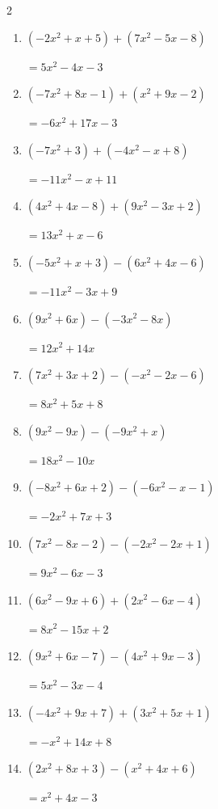 \begin{multicols}{2}
\begin{enumerate}
  \item $(-2x^{2}+x+5)+(7x^{2}-5x-8)$

        $=5x^{2}-4x-3$

  \item $(-7x^{2}+8x-1)+(x^{2}+9x-2)$

        $=-6x^{2}+17x-3$

  \item $(-7x^{2}+3)+(-4x^{2}-x+8)$

        $=-11x^{2}-x+11$

\columnbreak %

  \item $(4x^{2}+4x-8)+(9x^{2}-3x+2)$

        $=13x^{2}+x-6$

  \item $(-5x^{2}+x+3)-(6x^{2}+4x-6)$

        $=-11x^{2}-3x+9$

  \item $(9x^{2}+6x)-(-3x^{2}-8x)$

        $=12x^{2}+14x$

  \item $(7x^{2}+3x+2)-(-x^{2}-2x-6)$

        $=8x^{2}+5x+8$

  \item $(9x^{2}-9x)-(-9x^{2}+x)$

        $=18x^{2}-10x$

  \item $(-8x^{2}+6x+2)-(-6x^{2}-x-1)$

        $=-2x^{2}+7x+3$

  \item $(7x^{2}-8x-2)-(-2x^{2}-2x+1)$

        $=9x^{2}-6x-3$

  \item $(6x^{2}-9x+6)+(2x^{2}-6x-4)$

        $=8x^{2}-15x+2$

  \item $(9x^{2}+6x-7)-(4x^{2}+9x-3)$

        $=5x^{2}-3x-4$

  \item $(-4x^{2}+9x+7)+(3x^{2}+5x+1)$

        $=-x^{2}+14x+8$

  \item $(2x^{2}+8x+3)-(x^{2}+4x+6)$

        $=x^{2}+4x-3$


\end{enumerate}
\end{multicols}
